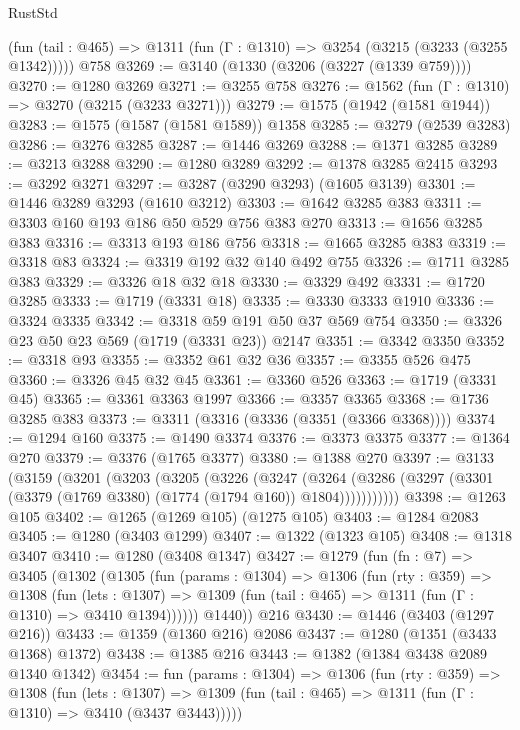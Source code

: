 \begin{lexlean}{RustStd}
\begin{coremodule}
    (fun (tail : @465) => @1311 (fun (Γ : @1310) => @3254 (@3215 (@3233 (@3255 @1342)))))
    @758
@3269 := @3140 (@1330 (@3206 (@3227 (@1339 @759))))
@3270 := @1280 @3269
@3271 := @3255 @758
@3276 := @1562 (fun (Γ : @1310) => @3270 (@3215 (@3233 @3271)))
@3279 := @1575 (@1942 (@1581 @1944))
@3283 := @1575 (@1587 (@1581 @1589)) @1358
@3285 := @3279 (@2539 @3283)
@3286 := @3276 @3285
@3287 := @1446 @3269
@3288 := @1371 @3285
@3289 := @3213 @3288
@3290 := @1280 @3289
@3292 := @1378 @3285 @2415
@3293 := @3292 @3271
@3297 := @3287 (@3290 @3293) (@1605 @3139)
@3301 := @1446 @3289 @3293 (@1610 @3212)
@3303 := @1642 @3285 @383
@3311 := @3303 @160 @193 @186 @50 @529 @756 @383 @270
@3313 := @1656 @3285 @383
@3316 := @3313 @193 @186 @756
@3318 := @1665 @3285 @383
@3319 := @3318 @83
@3324 := @3319 @192 @32 @140 @492 @755
@3326 := @1711 @3285 @383
@3329 := @3326 @18 @32 @18
@3330 := @3329 @492
@3331 := @1720 @3285
@3333 := @1719 (@3331 @18)
@3335 := @3330 @3333 @1910
@3336 := @3324 @3335
@3342 := @3318 @59 @191 @50 @37 @569 @754
@3350 := @3326 @23 @50 @23 @569 (@1719 (@3331 @23)) @2147
@3351 := @3342 @3350
@3352 := @3318 @93
@3355 := @3352 @61 @32 @36
@3357 := @3355 @526 @475
@3360 := @3326 @45 @32 @45
@3361 := @3360 @526
@3363 := @1719 (@3331 @45)
@3365 := @3361 @3363 @1997
@3366 := @3357 @3365
@3368 := @1736 @3285 @383
@3373 := @3311 (@3316 (@3336 (@3351 (@3366 @3368))))
@3374 := @1294 @160
@3375 := @1490 @3374
@3376 := @3373 @3375
@3377 := @1364 @270
@3379 := @3376 (@1765 @3377)
@3380 := @1388 @270
@3397 := @3133
    (@3159
      (@3201
        (@3203
          (@3205
            (@3226
              (@3247
                (@3264
                  (@3286 (@3297 (@3301 (@3379 (@1769 @3380) (@1774 (@1794 @160)) @1804)))))))))))
@3398 := @1263 @105
@3402 := @1265 (@1269 @105) (@1275 @105)
@3403 := @1284 @2083
@3405 := @1280 (@3403 @1299)
@3407 := @1322 (@1323 @105)
@3408 := @1318 @3407
@3410 := @1280 (@3408 @1347)
@3427 := @1279
    (fun (fn : @7) =>
    @3405
      (@1302
        (@1305
          (fun (params : @1304) =>
          @1306
            (fun (rty : @359) =>
            @1308
              (fun (lets : @1307) =>
              @1309 (fun (tail : @465) => @1311 (fun (Γ : @1310) => @3410 @1394))))))
        @1440))
    @216
@3430 := @1446 (@3403 (@1297 @216))
@3433 := @1359 (@1360 @216) @2086
@3437 := @1280 (@1351 (@3433 @1368) @1372)
@3438 := @1385 @216
@3443 := @1382 (@1384 @3438 @2089 @1340 @1342)
@3454 := fun (params : @1304) =>
  @1306
    (fun (rty : @359) =>
    @1308
      (fun (lets : @1307) =>
      @1309 (fun (tail : @465) => @1311 (fun (Γ : @1310) => @3410 (@3437 @3443)))))

\end{coremodule}
\end{lexlean}
